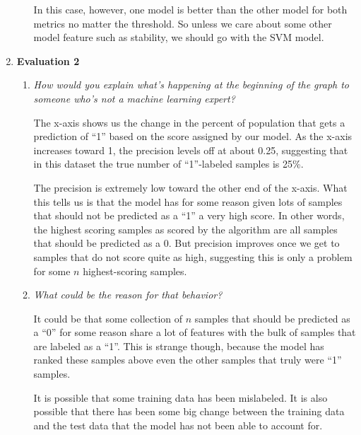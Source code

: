 \documentclass[11pt]{article}
\begin{document}
\begin{enumerate}
\begin{enumerate}
                In this case, however, one model is better than the other model
                for both metrics no matter the threshold. So unless we care
                about some other model feature such as stability, we should go
                with the SVM model.
        \end{enumerate}

    \item \textbf{Evaluation 2}
        \begin{enumerate}
            \item \textit{How would you explain what's happening at the
                beginning of the graph to someone who's not a machine learning
                expert?}

                The x-axis shows us the change in the percent of population
                that gets a prediction of ``1'' based on the score assigned by
                our model. As the x-axis increases toward 1, the precision
                levels off at about 0.25, suggesting that in this dataset the
                true number of ``1''-labeled samples is 25\%.

                The precision is extremely low toward the other end of the
                x-axis. What this tells us is that the model has for some
                reason given lots of samples that should not be predicted as a
                ``1'' a very high score. In other words, the highest scoring
                samples as scored by the algorithm are all samples that should
                be predicted as a 0. But precision improves once we get to
                samples that do not score quite as high, suggesting this is
                only a problem for some $n$ highest-scoring samples.

            \item \textit{What could be the reason for that behavior?}

                It could be that some collection of $n$ samples that should be
                predicted as a ``0'' for some reason share a lot of features
                with the bulk of samples that are labeled as a ``1''. This is
                strange though, because the model has ranked these samples
                above even the other samples that truly were ``1'' samples.

                It is possible that some training data has been mislabeled. It
                is also possible that there has been some big change between
                the training data and the test data that the model has not been
                able to account for.


\end{enumerate}
\end{enumerate}
\end{document}
